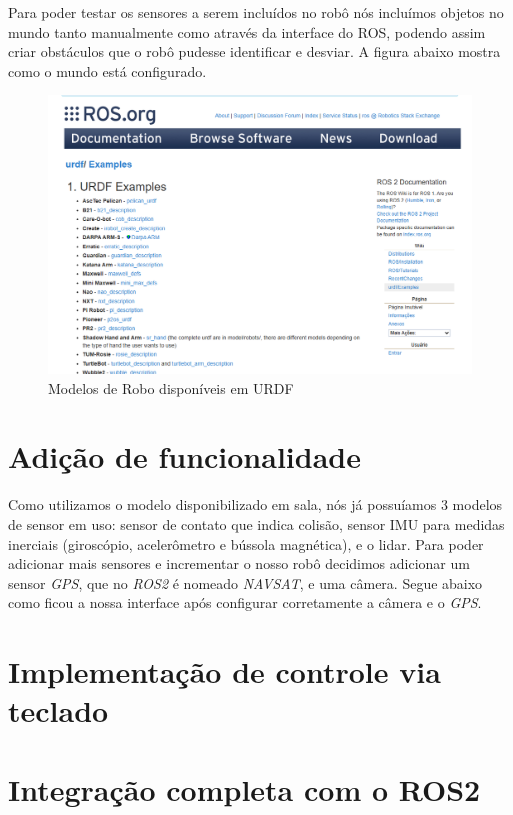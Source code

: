 Para poder testar os sensores a serem incluídos no robô nós incluímos objetos no mundo tanto manualmente como através da interface do ROS, podendo assim criar obstáculos que o robô pudesse identificar e desviar. A figura abaixo mostra como o mundo está configurado.

\begin{figure}[h]
    \centering
    \includegraphics[width=0.5\linewidth]{Figuras/URDF.png}
    \caption{Modelos de Robo disponíveis em URDF}
    \label{fig:URDF}
\end{figure}


\chapter{Adição de funcionalidade}\label{Funcionalidades}

Como utilizamos o modelo disponibilizado em sala, nós já possuíamos 3 modelos de sensor em uso: sensor de contato que indica colisão, sensor IMU para medidas inerciais (giroscópio, acelerômetro e bússola magnética), e o lidar. Para poder adicionar mais sensores e incrementar o nosso robô decidimos adicionar um sensor \textit{GPS}, que no \textit{ROS2} é nomeado \textit{NAVSAT}, e uma câmera. Segue abaixo como ficou a nossa interface após configurar corretamente a câmera e o \textit{GPS}.



\chapter{Implementação de controle via teclado} \label{Implementação}


\chapter{Integração completa com o ROS2} \label{Integração}





